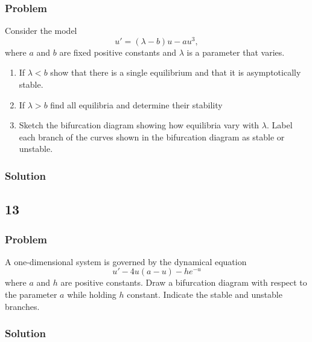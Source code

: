 \documentclass[12pt]{article}
\begin{document}
\subsubsection*{Problem}
Consider the model
\begin{equation}
  \label{eq:9-problem}
  u'=(\lambda - b) u-au^3,
\end{equation}
where $a$ and $b$ are fixed positive constants and $\lambda$ is a parameter that
varies.

\begin{enumerate}
\item If $\lambda < b$  show that there is a single equilibrium and that it is
  asymptotically stable.
\item If $\lambda > b$ find all equilibria and determine their stability
\item Sketch the bifurcation diagram showing how equilibria vary with $\lambda$.
  Label each branch of the curves shown in the bifurcation diagram as stable or
  unstable.
\end{enumerate}

\subsubsection*{Solution}
\todo[]

\subsection{13}
\subsubsection*{Problem}
A one-dimensional system is governed by the dynamical equation
\begin{equation}
  \label{eq:13-problem}
  u'-4u(a-u)-he^{-u}
\end{equation}
where $a$ and $h$ are positive constants. Draw a bifurcation diagram with
respect to the parameter $a$ while holding $h$ constant. Indicate the stable and
unstable branches.

\subsubsection*{Solution}
\todo[]

\newpage
\end{document}
